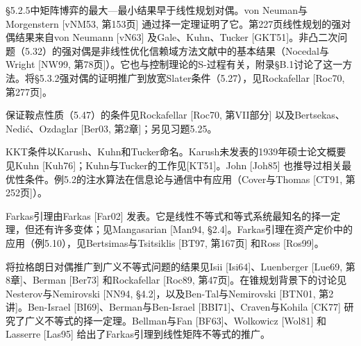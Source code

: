 §5.2.5中矩阵博弈的最大—最小结果早于线性规划对偶。von Neuman与Morgenstern [vNM53, 第153页] 通过择一定理证明了它。第227页线性规划的强对偶结果来自von Neumann [vN63] 及Gale、Kuhn、Tucker [GKT51]。非凸二次问题（5.32）的强对偶是非线性优化信赖域方法文献中的基本结果（Nocedal与Wright [NW99, 第78页]）。它也与控制理论的S-过程有关，附录§B.1讨论了这一方法。将§5.3.2强对偶的证明推广到放宽Slater条件（5.27），见Rockafellar [Roc70, 第277页]。

保证鞍点性质（5.47）的条件见Rockafellar [Roc70, 第VII部分] 以及Bertsekas、Nedić、Ozdaglar [Ber03, 第2章]；另见习题5.25。

KKT条件以Karush、Kuhn和Tucker命名。Karush未发表的1939年硕士论文概要见Kuhn [Kuh76]；Kuhn与Tucker的工作见[KT51]。John [Joh85] 也推导过相关最优性条件。例5.2的注水算法在信息论与通信中有应用（Cover与Thomas [CT91, 第252页]）。

Farkas引理由Farkas [Far02] 发表。它是线性不等式和等式系统最知名的择一定理，但还有许多变体；见Mangasarian [Man94, §2.4]。Farkas引理在资产定价中的应用（例5.10），见Bertsimas与Tsitsiklis [BT97, 第167页] 和Ross [Ros99]。

将拉格朗日对偶推广到广义不等式问题的结果见Isii [Isi64]、Luenberger [Lue69, 第8章]、Berman [Ber73] 和Rockafellar [Roc89, 第47页]。在锥规划背景下的讨论见Nesterov与Nemirovski [NN94, §4.2]，以及Ben-Tal与Nemirovski [BTN01, 第2讲]。Ben-Israel [BI69]、Berman与Ben-Israel [BBI71]、Craven与Kohila [CK77] 研究了广义不等式的择一定理。Bellman与Fan [BF63]、Wolkowicz [Wol81] 和Lasserre [Las95] 给出了Farkas引理到线性矩阵不等式的推广。
